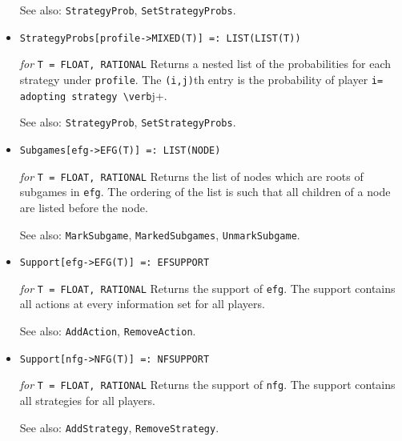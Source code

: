 \begin{itemize}
{\it for} {\tt T = FLOAT, RATIONAL}
\bd
Returns a list of the probabilities with which \verb+player+ adopts
each strategy.  It is an error if \verb+profile+
and \verb+player+ are not from the same normal form game.
\item [See also:] \verb+StrategyProb+, \verb+SetStrategyProbs+.
\ed

\item{}
\protect \large \begin{verbatim}
StrategyProbs[profile->MIXED(T)] =: LIST(LIST(T))
\end{verbatim} \normalsize

{\it for} {\tt T = FLOAT, RATIONAL}
\bd
Returns a nested list of the probabilities for each strategy under
\verb+profile+.  The \verb+(i,j)+th entry is the probability of player
\verb+i= adopting strategy \verb+j+.
\item [See also:] \verb+StrategyProb+, \verb+SetStrategyProbs+.
\ed

\item{}
\protect \large \begin{verbatim}
Subgames[efg->EFG(T)] =: LIST(NODE)
\end{verbatim}\normalsize

{\it for} {\tt T = FLOAT, RATIONAL}
\bd
Returns the list of nodes which are roots of subgames in \verb+efg+.
The ordering of the list is such that
all children of a node are listed before the node.
\item [See also:] \verb+MarkSubgame+, \verb+MarkedSubgames+, 
\verb+UnmarkSubgame+.
\ed

\item{}
\protect \large \begin{verbatim}
Support[efg->EFG(T)] =: EFSUPPORT
\end{verbatim}\normalsize

{\it for} {\tt T = FLOAT, RATIONAL}
\bd
Returns the support of \verb+efg+.  The support contains all actions at every
information set for all players.
\item [See also:] \verb+AddAction+, \verb+RemoveAction+.
\ed

\item{}
\protect \large \begin{verbatim}
Support[nfg->NFG(T)] =: NFSUPPORT
\end{verbatim}\normalsize

{\it for} {\tt T = FLOAT, RATIONAL}
\bd
Returns the support of \verb+nfg+.  The support contains all strategies
for all players.
\item [See also:] \verb+AddStrategy+, \verb+RemoveStrategy+.
\ed


\end{itemize}

